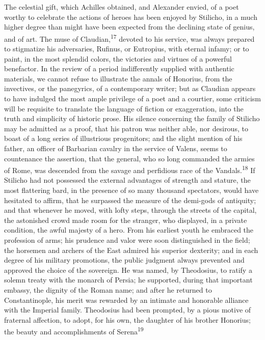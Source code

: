 The celestial gift, which Achilles obtained, and Alexander
envied, of a poet worthy to celebrate the actions of heroes has
been enjoyed by Stilicho, in a much higher degree than might have
been expected from the declining state of genius, and of art. The
muse of Claudian,\textsuperscript{17} devoted to his service, was always prepared
to stigmatize his adversaries, Rufinus, or Eutropius, with
eternal infamy; or to paint, in the most splendid colors, the
victories and virtues of a powerful benefactor. In the review of
a period indifferently supplied with authentic materials, we
cannot refuse to illustrate the annals of Honorius, from the
invectives, or the panegyrics, of a contemporary writer; but as
Claudian appears to have indulged the most ample privilege of a
poet and a courtier, some criticism will be requisite to
translate the language of fiction or exaggeration, into the truth
and simplicity of historic prose. His silence concerning the
family of Stilicho may be admitted as a proof, that his patron
was neither able, nor desirous, to boast of a long series of
illustrious progenitors; and the slight mention of his father, an
officer of Barbarian cavalry in the service of Valens, seems to
countenance the assertion, that the general, who so long
commanded the armies of Rome, was descended from the savage and
perfidious race of the Vandals.\textsuperscript{18} If Stilicho had not possessed
the external advantages of strength and stature, the most
flattering bard, in the presence of so many thousand spectators,
would have hesitated to affirm, that he surpassed the measure of
the demi-gods of antiquity; and that whenever he moved, with
lofty steps, through the streets of the capital, the astonished
crowd made room for the stranger, who displayed, in a private
condition, the awful majesty of a hero. From his earliest youth
he embraced the profession of arms; his prudence and valor were
soon distinguished in the field; the horsemen and archers of the
East admired his superior dexterity; and in each degree of his
military promotions, the public judgment always prevented and
approved the choice of the sovereign. He was named, by
Theodosius, to ratify a solemn treaty with the monarch of Persia;
he supported, during that important embassy, the dignity of the
Roman name; and after he returned to Constantinople, his merit
was rewarded by an intimate and honorable alliance with the
Imperial family. Theodosius had been prompted, by a pious motive
of fraternal affection, to adopt, for his own, the daughter of
his brother Honorius; the beauty and accomplishments of Serena\textsuperscript{19}
